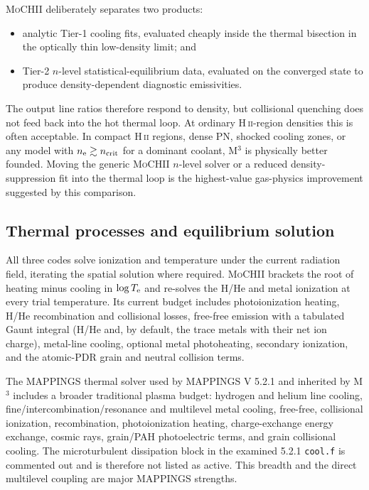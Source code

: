 \documentclass[english,a4paper]{my_memo}
\newcommand{\code}[1]{\texttt{#1}}
\newcommand{\MoCHII}{\textsc{MoCHII}}
\newcommand{\Mthree}{M$^3$}
\newcommand{\Mappings}{MAPPINGS V 5.2.1}
\newcommand{\Te}{T_{\rm e}}
\newcommand{\nelec}{n_{\rm e}}
\begin{document}
\MoCHII{} deliberately separates two products:

\begin{itemize}[leftmargin=2em]
\item analytic Tier-1 cooling fits, evaluated cheaply inside the thermal
  bisection in the optically thin low-density limit; and
\item Tier-2 $n$-level statistical-equilibrium data, evaluated on the
  converged state to produce density-dependent diagnostic emissivities.
\end{itemize}

The output line ratios therefore respond to density, but collisional
quenching does not feed back into the hot thermal loop.  At ordinary
H\,\textsc{ii}-region densities this is often acceptable.  In compact
H\,\textsc{ii} regions, dense PN, shocked cooling zones, or any model with
$\nelec\gtrsim n_{\rm crit}$ for a dominant coolant, \Mthree{} is
physically better founded.  Moving the generic \MoCHII{} $n$-level solver
or a reduced density-suppression fit into the thermal loop is the
highest-value gas-physics improvement suggested by this comparison.

\subsection{Thermal processes and equilibrium solution}

All three codes solve ionization and temperature under the current
radiation field, iterating the spatial solution where required.  \MoCHII{}
brackets the root of heating minus cooling in
$\log \Te$ and re-solves the H/He and metal ionization at every trial
temperature.  Its current budget includes photoionization heating,
H/He recombination and collisional losses, free-free emission with a
tabulated Gaunt integral (H/He and, by default, the trace metals with
their net ion charge), metal-line cooling, optional metal
photoheating, secondary ionization, and the atomic-PDR grain and neutral
collision terms.

The MAPPINGS thermal solver used by \Mappings{} and inherited by \Mthree{}
includes a broader traditional plasma budget:
hydrogen and helium line cooling, fine/intercombination/resonance and
multilevel metal cooling, free-free, collisional ionization,
recombination, photoionization heating, charge-exchange energy exchange,
cosmic rays, grain/PAH photoelectric terms, and grain collisional cooling.
The microturbulent dissipation block in the examined 5.2.1
\code{cool.f} is commented out and is therefore not listed as active.
This breadth and the direct multilevel coupling are major MAPPINGS
strengths.
\end{document}
